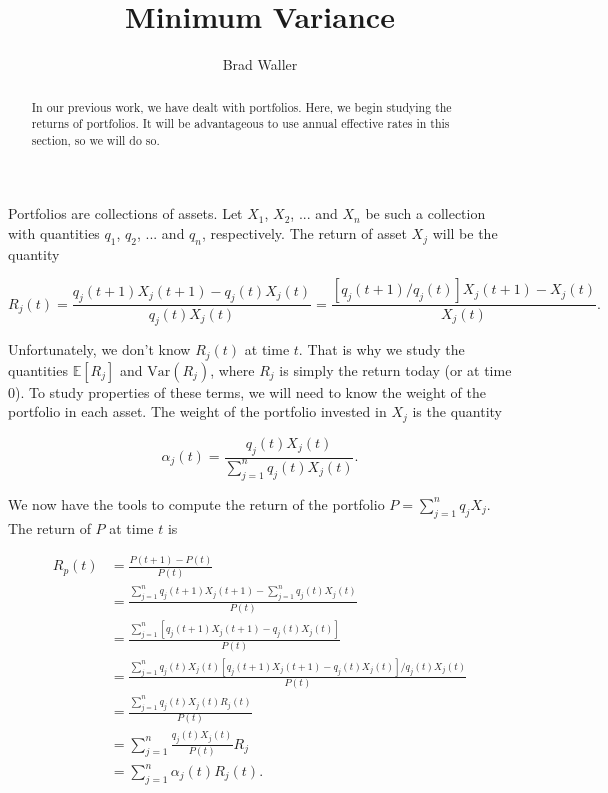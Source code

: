 \documentclass{ximera}
\author{Brad Waller}
\title{Minimum Variance}
\begin{document}
\begin{abstract}
In our previous work, we have dealt with portfolios. Here, we begin studying the returns of portfolios. It will be advantageous to use annual effective rates in this section, so we will do so.
\end{abstract}

\maketitle

Portfolios are collections of assets. Let $X_1$, $X_2$, ... and $X_n$ be such a collection with quantities $q_1$, $q_2$, ... and $q_n$, respectively. The return of asset $X_j$ will be the quantity

\begin{equation*}
R_j(t)=\frac{q_j(t+1)X_j(t+1)-q_j(t)X_j(t)}{q_j(t)X_j(t)}=\frac{[q_j(t+1)/q_j(t)]X_j(t+1)-X_j(t)}{X_j(t)}.
\end{equation*}

Unfortunately, we don't know $R_j(t)$ at time $t$. That is why we study the quantities $\mathbb{E}[R_j]$ and $\text{Var}(R_j)$, where $R_j$ is simply the return today (or at time $0$). To study properties of these terms, we will need to know the weight of the portfolio in each asset. The weight of the portfolio invested in $X_j$ is the quantity

\begin{equation*}
\alpha_j(t)=\frac{q_j(t)X_j(t)}{\sum_{j=1}^nq_j(t)X_j(t)}.
\end{equation*}

We now have the tools to compute the return of the portfolio $P=\sum_{j=1}^nq_jX_j$. The return of $P$ at time $t$ is

\begin{align*}
R_p(t) 	&=\frac{P(t+1)-P(t)}{P(t)}\\
		&=\frac{\sum_{j=1}^nq_j(t+1)X_j(t+1)-\sum_{j=1}^nq_j(t)X_j(t)}{P(t)}\\
		&=\frac{\sum_{j=1}^n[q_j(t+1)X_j(t+1)-q_j(t)X_j(t)]}{P(t)}\\
		&=\frac{\sum_{j=1}^nq_j(t)X_j(t)[q_j(t+1)X_j(t+1)-q_j(t)X_j(t)]/q_j(t)X_j(t)}{P(t)}\\
		&=\frac{\sum_{j=1}^nq_j(t)X_j(t)R_j(t)}{P(t)}\\
		&=\sum_{j=1}^n\frac{q_j(t)X_j(t)}{P(t)}R_j\\
		&=\sum_{j=1}^n\alpha_j(t)R_j(t).
\end{align*}
\end{document}
